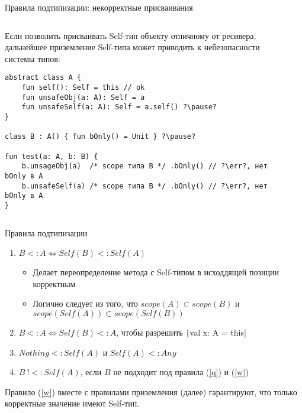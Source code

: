 \documentclass[handout,aspectratio=169,usenames,dvipsnames]{beamer}
\newcommand{\err}[0]{\textcolor{red}{ошибка}}
\begin{document}
\begin{frame}[fragile]{Правила подтипизации: некорректные присваивания}
    \begin{columns}[onlytextwidth]
        \begin{column}{0.99\textwidth}
                Если позволить присваивать Self-тип объекту отличному от ресивера, дальнейшее приземление Self-типа может приводить к небезопасности системы типов:
                \begin{verbatim}
abstract class A {
    fun self(): Self = this // ok
    fun unsafeObj(a: A): Self = a
    fun unsafeSelf(a: A): Self = a.self() ?\pause?
}

class B : A() { fun bOnly() = Unit } ?\pause?

fun test(a: A, b: B) {
    b.unsageObj(a)  /* scope типа B */ .bOnly() // ?\err?, нет bOnly в A
    b.unsafeSelf(a) /* scope типа B */ .bOnly() // ?\err?, нет bOnly в A
}
                \end{verbatim}
        \end{column}\hfill%
        \begin{column}{0.0\textwidth}
        \end{column}
    \end{columns}
\end{frame}

\begin{frame}[fragile]{Правила подтипизации}
    \begin{enumerate}
        \item \label{q} $B <: A \iff Self(B) <: Self(A)$
            \begin{itemize}
                \item Делает переопределение метода с Self-типом в исходдящей позиции корректным
                \item Логично следует из того, что $scope(A) \subset scope(B)$ и $scope(Self(A)) \subset scope(Self(B))$ \pause
            \end{itemize}
        \item $B <: A \iff Self(B) <: A$, чтобы разрешить \texttt|val x: A = this| \pause
        \item \label{w} $Nothing <: Self(A)$ и $Self(A) <: Any$ \pause
        \item $B  ~!<: Self(A)$, если $B$ не подходит под правила (\ref{q}) и (\ref{w}) \pause
    \end{enumerate}

    \vspace{1em}
    Правило (\ref{w}) вместе с правилами приземления (далее) гарантируют, что только корректные значение имеют Self-тип.
\end{frame}
\end{document}
